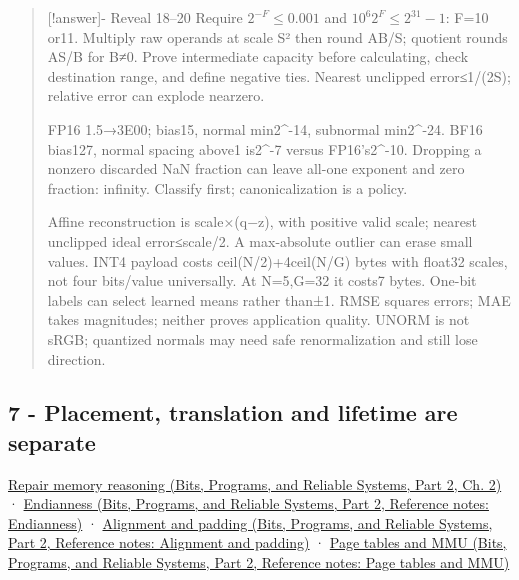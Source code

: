 \begin{quote}
{[}!answer{]}- Reveal 18--20 Require \(2^{-F}\le0.001\) and \(10^6 2^F\le2^{31}-1\): F=10 or11. Multiply raw operands at scale S² then round AB/S; quotient rounds AS/B for B≠0. Prove intermediate capacity before calculating, check destination range, and define negative ties. Nearest unclipped error≤1/(2S); relative error can explode nearzero.

FP16 1.5→3E00; bias15, normal min2\^{}-14, subnormal min2\^{}-24. BF16 bias127, normal spacing above1 is2\^{}-7 versus FP16's2\^{}-10. Dropping a nonzero discarded NaN fraction can leave all-one exponent and zero fraction: infinity. Classify first; canonicalization is a policy.

Affine reconstruction is scale×(q−z), with positive valid scale; nearest unclipped ideal error≤scale/2. A max-absolute outlier can erase small values. INT4 payload costs ceil(N/2)+4ceil(N/G) bytes with float32 scales, not four bits/value universally. At N=5,G=32 it costs7 bytes. One-bit labels can select learned means rather than±1. RMSE squares errors; MAE takes magnitudes; neither proves application quality. UNORM is not sRGB; quantized normals may need safe renormalization and still lose direction.
\end{quote}

\subsection{7 - Placement, translation and lifetime are separate}\label{appendix-ef4d27797a92-placement-translation-and-lifetime-are-separate}

\hypertarget{appendix-ef4d27797a92-placement-translation-and-lifetime-are-separate}{}

\href{../01-Bits-Programs-and-Reliable-Systems-P02/main.pdf\#01-foundations-i-ch002-where-the-bytes-live}{Repair memory reasoning (Bits, Programs, and Reliable Systems, Part 2, Ch. 2)} · \href{../01-Bits-Programs-and-Reliable-Systems-P02/main.pdf\#appendix-bc07c3d25b18}{Endianness (Bits, Programs, and Reliable Systems, Part 2, Reference notes: Endianness)} · \href{../01-Bits-Programs-and-Reliable-Systems-P02/main.pdf\#appendix-a1f7c53b4742}{Alignment and padding (Bits, Programs, and Reliable Systems, Part 2, Reference notes: Alignment and padding)} · \href{../01-Bits-Programs-and-Reliable-Systems-P02/main.pdf\#appendix-01e5905165c4}{Page tables and MMU (Bits, Programs, and Reliable Systems, Part 2, Reference notes: Page tables and MMU)}

